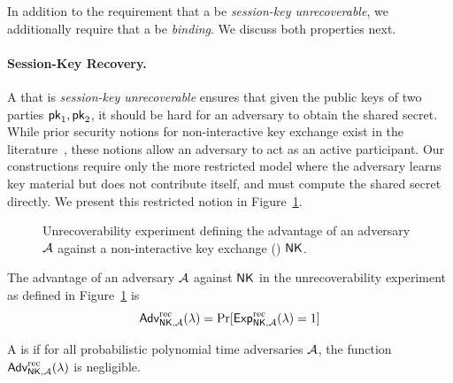 In addition to the requirement that a \ENIKE be \emph{session-key unrecoverable},
we additionally require that a \ENIKE be \emph{binding}.
We discuss both properties next.

\paragraph{Session-Key Recovery.}
A  \ENIKE that is \emph{session-key unrecoverable} ensures that given the public keys of two parties $\mathsf{pk}_1, \mathsf{pk}_2$,
it should be hard for an adversary to obtain the shared secret.
While prior security notions for non-interactive key exchange exist in the literature~\cite{CashKS08,FreireHKP13},
these notions allow an adversary to act as an active participant.
Our constructions require only the more restricted model where the adversary learns key material but does not contribute itself,
and must compute the shared secret directly.
We present this restricted notion in Figure~\ref{fg:enike-recovery}.

\begin{figure}[t]
  \begin{pchstack}[boxed,center,space=1em]
\end{pchstack}

  \caption[Unrecoverability experiment for \ENIKE]{Unrecoverability experiment defining the advantage of an adversary $\mathcal{A}$ against a non-interactive key exchange (\ENIKE) $\mathsf{NK}$.
  }
\label{fg:enike-recovery}
\end{figure}



The advantage of an adversary $\mathcal{A}$ against $\mathsf{NK}$ in the unrecoverability experiment as defined in Figure~\ref{fg:enike-recovery} is
\[
  \textsf{\upshape Adv}^{\textrm{\upshape rec}}_{\mathsf{NK},\mathcal{A}}(\lambda) = \Pr[\textsf{Exp}^{\textrm{rec}}_{\mathsf{NK},\mathcal{A}}(\lambda) = 1 ]
\]

\begin{definition}
A \ENIKE is  if for all probabilistic polynomial time adversaries $\mathcal{A}$,
  the function $\textsf{\upshape Adv}^{\textrm{\upshape rec}}_{\mathsf{NK}, \mathcal{A}}(\lambda)$  is negligible.
\end{definition}


